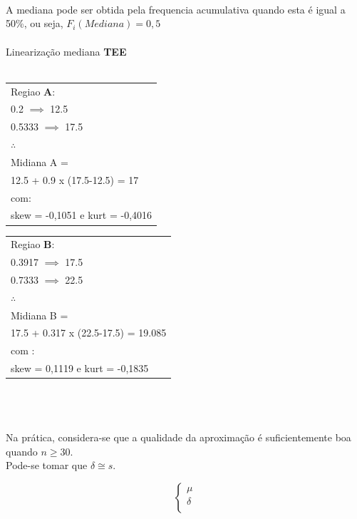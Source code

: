 \\
\\
\\
\noindent
A mediana pode ser obtida pela frequencia acumulativa quando esta é igual a 50\%, ou seja, $F_i(Mediana)=0,5$ \\
\\
Linearização mediana \textbf{TEE}\\
\\
\begin{minipage}[l]{0pt}
\begin{tabular}{l}
Regiao \textbf{A}:\\
0.2 $\implies$ 12.5 \\
0.5333 $\implies$ 17.5 \\
$\therefore$\\
Midiana A = \\
12.5 + 0.9 x (17.5-12.5) = 17 \\
com: \\
skew = -0,1051 e kurt = -0,4016 \\
\end{tabular}
\end{minipage} \hspace{10cm}
\begin{minipage}[l]{0pt}
\begin{tabular}{l}
Regiao \textbf{B}: \\
0.3917 $\implies$ 17.5 \\
0.7333 $\implies$ 22.5 \\
$\therefore$\\
Midiana B = \\
17.5 + 0.317 x (22.5-17.5) = 19.085 \\
com : \\
skew = 0,1119 e kurt = -0,1835 \\
\end{tabular}
\end{minipage}\\
\\
\\
\noindent
Na prática, considera-se que a qualidade da aproximação é suficientemente boa quando $n \geqslant 30$.  \\
Pode-se tomar que $\delta \cong s$. \\
\begin{minipage}[l]{0pt}
$$\left\lbrace\begin{array}{c}
\mu \\
\delta \\
\end{array}\right.$$
\end{minipage}
